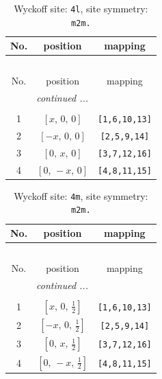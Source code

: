 \documentclass[fleqn,8pt]{jsarticle}
\begin{document}
\renewcommand{\arraystretch}{1.2}
\begin{longtable}{ccc}
\caption{Wyckoff site: {\tt 4l}, site symmetry: {\tt m2m.}}
 \\
 \hline \hline
No. & position & mapping \\ \hline \endfirsthead

\multicolumn{2}{l}{\tablename\ \thetable{}} \\
 \hline \hline
No. & position & mapping \\ \hline \endhead

 \hline \hline
\multicolumn{2}{r}{\footnotesize\it continued ...} \\ \endfoot

 \hline \hline
\multicolumn{2}{r}{} \\ \endlastfoot

1 & $\left[ x,\, 0,\, 0 \right]$ & {\tt [1,6,10,13]} \\ \hline
2 & $\left[ - x,\, 0,\, 0 \right]$ & {\tt [2,5,9,14]} \\ \hline
3 & $\left[ 0,\, x,\, 0 \right]$ & {\tt [3,7,12,16]} \\ \hline
4 & $\left[ 0,\, - x,\, 0 \right]$ & {\tt [4,8,11,15]} \\
\end{longtable}
\renewcommand{\arraystretch}{1.2}
\begin{longtable}{ccc}
\caption{Wyckoff site: {\tt 4m}, site symmetry: {\tt m2m.}}
 \\
 \hline \hline
No. & position & mapping \\ \hline \endfirsthead

\multicolumn{2}{l}{\tablename\ \thetable{}} \\
 \hline \hline
No. & position & mapping \\ \hline \endhead

 \hline \hline
\multicolumn{2}{r}{\footnotesize\it continued ...} \\ \endfoot

 \hline \hline
\multicolumn{2}{r}{} \\ \endlastfoot

1 & $\left[ x,\, 0,\, \frac{1}{2} \right]$ & {\tt [1,6,10,13]} \\ \hline
2 & $\left[ - x,\, 0,\, \frac{1}{2} \right]$ & {\tt [2,5,9,14]} \\ \hline
3 & $\left[ 0,\, x,\, \frac{1}{2} \right]$ & {\tt [3,7,12,16]} \\ \hline
4 & $\left[ 0,\, - x,\, \frac{1}{2} \right]$ & {\tt [4,8,11,15]} \\
\end{longtable}
\end{document}

